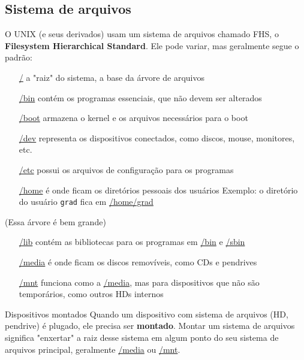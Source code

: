 \documentclass{beamer}
\begin{document}
\subsection{Sistema de arquivos}

\begin{frame}

	O UNIX (e seus derivados) usam um sistema de arquivos chamado FHS, o
	\textbf{Filesystem Hierarchical Standard}. Ele pode variar, mas geralmente
	segue o padrão:

	\begin{itemize}
		\item[\url{/}] a "raiz" do sistema, a base da árvore de arquivos
		\item[\url{/bin}] contém os programas essenciais, que não devem ser alterados
		\item[\url{/boot}] armazena o kernel e os arquivos necessários para o boot
		\item[\url{/dev}] representa os dispositivos conectados, como discos, mouse,
			monitores, etc.
		\item[\url{/etc}] possui os arquivos de configuração para os programas
		\item[\url{/home}] é onde ficam os diretórios pessoais dos usuários
			\newline
			Exemplo: o diretório do usuário \texttt{grad} fica em \url{/home/grad}
	\end{itemize}

\end{frame}

\begin{frame}

	(Essa árvore é bem grande)

	\begin{itemize}
		\item[\url{/lib}] contém as bibliotecas para os programas em \url{/bin} e
			\url{/sbin}
		\item[\url{/media}] é onde ficam os discos removíveis, como CDs e pendrives
		\item[\url{/mnt}] funciona como a \url{/media}, mas para dispositivos que
			não são temporários, como outros HDs internos
	\end{itemize}

	\begin{block}{Dispositivos montados}
		Quando um dispositivo com sistema de arquivos (HD, pendrive) é plugado, ele
		precisa ser \textbf{montado}. Montar um sistema de arquivos significa 
		"enxertar" a raiz desse sistema em algum ponto do seu sistema de arquivos
		principal, geralmente \url{/media} ou \url{/mnt}.
	\end{block}
	
\end{frame}
\end{document}

